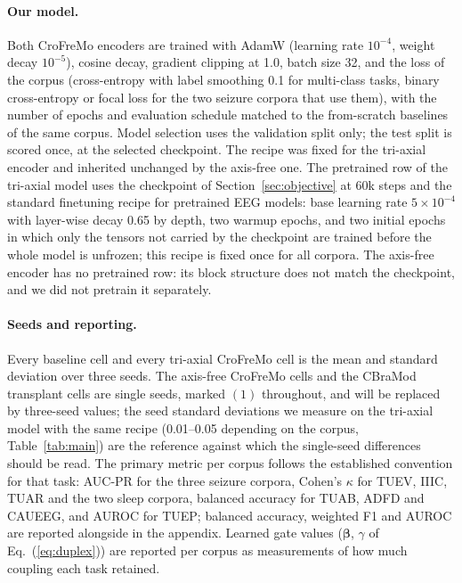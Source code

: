 \paragraph{Our model.}
Both CroFreMo encoders are trained with AdamW (learning rate $10^{-4}$,
weight decay $10^{-5}$), cosine decay, gradient clipping at 1.0, batch
size 32, and the loss of the corpus (cross-entropy with label smoothing
0.1 for multi-class tasks, binary cross-entropy or focal loss for the two
seizure corpora that use them), with the number of epochs and evaluation
schedule matched to the from-scratch baselines of the same corpus. Model
selection uses the validation split only; the test split is scored once,
at the selected checkpoint. The recipe was fixed for the tri-axial encoder
and inherited unchanged by the axis-free one. The pretrained row of the
tri-axial model uses the checkpoint of Section~\ref{sec:objective} at 60k
steps and the standard finetuning recipe for pretrained EEG models: base
learning rate $5\times10^{-4}$ with layer-wise decay 0.65 by depth, two
warmup epochs, and two initial epochs in which only the tensors not
carried by the checkpoint are trained before the whole model is unfrozen;
this recipe is fixed once for all corpora. The axis-free encoder has no
pretrained row: its block structure does not match the checkpoint, and we
did not pretrain it separately.

\paragraph{Seeds and reporting.}
Every baseline cell and every tri-axial CroFreMo cell is the mean and
standard deviation over three seeds. The axis-free CroFreMo cells and the
CBraMod transplant cells are single seeds, marked $(1)$ throughout, and
will be replaced by three-seed values; the seed standard deviations we
measure on the tri-axial model with the same recipe (0.01--0.05 depending
on the corpus, Table~\ref{tab:main}) are the reference against which the
single-seed differences should be read. The primary metric per corpus
follows the established convention for that task: AUC-PR for the three
seizure corpora, Cohen's $\kappa$ for TUEV, IIIC, TUAR and the two sleep
corpora, balanced accuracy for TUAB, ADFD and CAUEEG, and AUROC for TUEP;
balanced accuracy, weighted F1 and AUROC are reported alongside in the
appendix. Learned gate values ($\boldsymbol{\beta}$, $\gamma$ of
Eq.~(\ref{eq:duplex})) are reported per corpus as measurements of how much
coupling each task retained.

